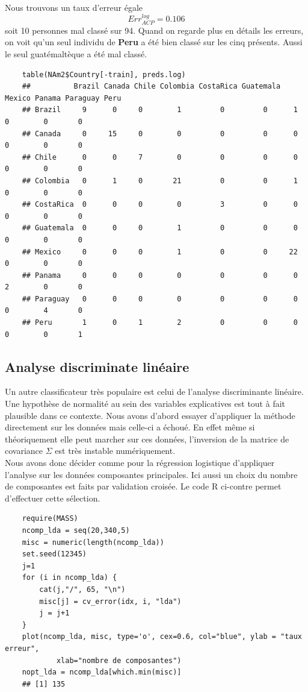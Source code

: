 \documentclass[12pt,a4paper]{article}
\begin{document}
Nous trouvons un taux d'erreur égale \[Err_{ACP}^{log} = 0.106\] soit 10 personnes mal classé sur 94. Quand on regarde plus en détails les erreurs, on voit qu'un seul individu de \textbf{Peru} a été bien classé sur les cinq présents. Aussi le seul guatémaltèque a été mal classé.
\begin{lstlisting}
	table(NAm2$Country[-train], preds.log)
	## 			Brazil Canada Chile Colombia CostaRica Guatemala Mexico Panama Paraguay Peru
	## Brazil     9      0     0        1         0         0      1      0        0       0
	## Canada     0     15     0        0         0         0      0      0        0       0
	## Chile      0      0     7        0         0         0      0      0        0       0
	## Colombia   0      1     0       21         0         0      1      0        0       0
	## CostaRica  0      0     0        0         3         0      0      0        0       0
	## Guatemala  0      0     0        1         0         0      0      0        0       0
	## Mexico     0      0     0        1         0         0     22      0        0       0
	## Panama     0      0     0        0         0         0      0      2        0       0
	## Paraguay   0      0     0        0         0         0      0      0        4       0
	## Peru       1      0     1        2         0         0      0      0        0       1
\end{lstlisting}
\subsection{Analyse discriminate linéaire}
Un autre classificateur très populaire est celui de l'analyse discriminante linéaire. Une hypothèse de normalité au sein des variables explicatives est tout à fait plausible dans ce contexte. Nous avons d'abord essayer d'appliquer la méthode directement sur les données mais celle-ci a échoué. En effet même si théoriquement elle peut marcher sur ces données, l'inversion de la matrice de covariance $\Sigma$ est très instable numériquement.\\
Nous avons donc décider comme pour la régression logistique d'appliquer l'analyse sur les données composantes principales. Ici aussi un choix du nombre de composantes est faits par validation croisée. Le code R ci-contre permet d'effectuer cette sélection.\vspace{2mm}
\begin{lstlisting}
	require(MASS)
	ncomp_lda = seq(20,340,5)
	misc = numeric(length(ncomp_lda))
	set.seed(12345)
	j=1
	for (i in ncomp_lda) {
		cat(j,"/", 65, "\n")
		misc[j] = cv_error(idx, i, "lda")
		j = j+1
	}
	plot(ncomp_lda, misc, type='o', cex=0.6, col="blue", ylab = "taux erreur",
			xlab="nombre de composantes")
	nopt_lda = ncomp_lda[which.min(misc)]
	## [1] 135
\end{lstlisting}
\end{document}
